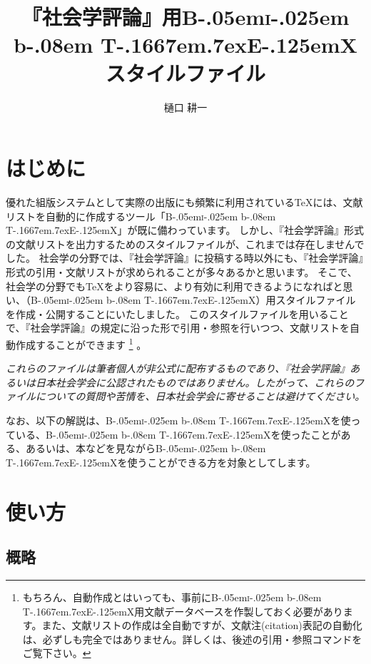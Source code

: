 \documentclass[article, 11pt]{jlreq}
\def\BibTeX{{\textrm{B}\kern-.05em{\textsc{i}\kern-.025em b}\kern-.08em
    T\kern-.1667em\lower.7ex\hbox{E}\kern-.125emX}}
\begin{document}
\title{『社会学評論』用\BibTeX スタイルファイル}
\author{樋口 耕一}
\maketitle


\section*{はじめに}

優れた組版システムとして実際の出版にも頻繁に利用されている\TeX には、文献リストを自動的に作成するツール「\BibTeX 」が既に備わっています。
しかし、『社会学評論』形式の文献リストを出力するためのスタイルファイルが、これまでは存在しませんでした。
社会学の分野では、『社会学評論』に投稿する時以外にも、『社会学評論』形式の引用・文献リストが求められることが多々あるかと思います。
そこで、社会学の分野でも\TeX をより容易に、より有効に利用できるようになればと思い、\LaTeXe （\BibTeX）用スタイルファイルを作成・公開することにいたしました。
このスタイルファイルを用いることで、『社会学評論』の規定に沿った形で引用・参照を行いつつ、文献リストを自動作成することができます
\footnote{もちろん、自動作成とはいっても、事前に\BibTeX 用文献データベースを作製しておく必要があります。また、文献リストの作成は全自動ですが、文献注(citation)表記の自動化は、必ずしも完全ではありません。詳しくは、後述の引用・参照コマンドをご覧下さい。}
。

\emph{
これらのファイルは筆者個人が非公式に配布するものであり、『社会学評論』あるいは日本社会学会に公認されたものではありません。したがって、これらのファイルについての質問や苦情を、日本社会学会に寄せることは避けてください。
}

なお、以下の解説は、\BibTeX を使っている、\BibTeX を使ったことがある、あるいは、本などを見ながら\BibTeX を使うことができる方を対象としてします。

\section{使い方}

\subsection{概略}
\end{document}
